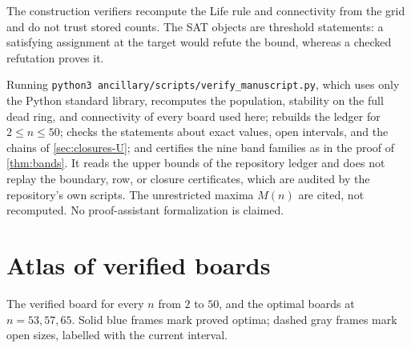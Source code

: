 \documentclass[10pt]{article}
\theoremstyle{remark}
\begin{document}
The construction verifiers recompute the Life rule and connectivity from the grid
and do not trust stored counts.  The SAT objects are threshold statements: a
satisfying assignment at the target would refute the bound, whereas a checked
refutation proves it.

Running \texttt{python3 ancillary/scripts/verify\_manuscript.py}, which uses only
the Python standard library, recomputes the population, stability on the full
dead ring, and connectivity of every board used here; rebuilds the ledger for
$2\le n\le50$; checks the statements about exact values, open intervals, and the
chains of \cref{sec:closures-U}; and certifies the nine band families as in the
proof of \cref{thm:bands}.  It reads the upper bounds of the repository ledger
and does not replay the boundary, row, or closure certificates, which are audited
by the repository's own scripts.  The unrestricted maxima $M(n)$ are cited, not
recomputed.  No proof-assistant formalization is claimed.

\section{Atlas of verified boards}\label{app:atlas}

The verified board for every $n$ from $2$ to $50$, and the optimal boards at
$n=53,57,65$.  Solid blue frames mark proved optima; dashed gray frames mark open
sizes, labelled with the current interval.

\medskip

\end{document}
